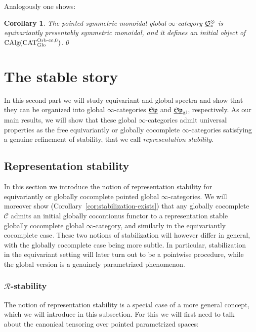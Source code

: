 \documentclass[reqno]{memo-l}
\theoremstyle{mythm}
\newtheorem{cor}[thm]{Corollary}
\theoremstyle{definition}
\numberwithin{equation}{section}
\newcommand{\Cc}{{\mathcal{C}}}
\newcommand{\gl}{\textup{gl}}
\DeclareMathOperator{\CAT}{CAT}
\DeclareMathOperator{\CAlg}{\textup{CAlg}}
\newcommand{\Orb}{{\vphantom{\textup{t}}\smash{\textup{Orb}}}}
\newcommand{\Glo}{\textup{Glo}}
\newcommand{\ulhelper}[2]{\underline{\setbox0=\hbox{$#1#2$}\dp0=0.4pt \box0\relax}}
\newcommand{\ul}[1]{{\mathpalette\ulhelper{#1}}\hbox{\rule[-2pt]{0pt}{0pt}}}
\newcommand{\mySp}{{\mathfrak S\kern-.5pt\mathfrak p}}
\newcommand{\myS}{{{\mathfrak S\kern-.4pt}}}
\begin{document}
Analogously one shows:

\begin{cor}\label{cor:equiv-smash-initial}
    The pointed symmetric monoidal global $\infty$-category $\ul\myS_*^\otimes$ is equivariantly presentably symmetric monoidal, and it defines an initial object of $\CAlg(\CAT_{\smash{\Glo}}^{\textup{$\Orb$-cc},0})$.\qed
\end{cor}



\chapter[The stable story]{The stable story}
In this second part we will study equivariant and global spectra and show that they can be organized into global $\infty$-categories $\ul\mySp$ and $\ul\mySp_\gl$, respectively. As our main results, we will show that these global $\infty$-categories admit universal properties as the free equivariantly or globally cocomplete $\infty$-categories satisfying a genuine refinement of stability, that we call \emph{representation stability}.

\section[Representation stability]{Representation stability}\label{sec:rep-stable}
In this section we introduce the notion of {representation stability} for equivariantly or globally cocomplete pointed global $\infty$-categories. We will moreover show (Corollary~\ref{cor:stabilization-exists}) that any globally cocomplete $\Cc$ admits an initial globally cocontionus functor to a representation stable globally cocomplete global $\infty$-category, and similarly in the equivariantly cocomplete case. These two notions of stabilization will however differ in general, with the globally cocomplete case being more subtle. In particular, stabilization in the equivariant setting will later turn out to be a pointwise procedure, while the global version is a genuinely parametrized phenomenon.

\subsection{$\bm{\mathcal R}$-stability} The notion of representation stability is a special case of a more general concept, which we will introduce in this subsection. For this we will first need to talk about the canonical tensoring over pointed parametrized spaces:
\end{document}
